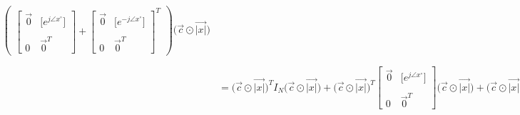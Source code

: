 \documentclass{article}
\begin{document}
\begin{align*}
\begin{pmatrix}
                                                                         \begin{bmatrix}
                                                                            \vec{0} & \big[e^{j\angle{x}^{\circ}}\big] \\ \\
                                                                            0 & \vec{0}^{T}
                                                                           \end{bmatrix} +
                                                                         \begin{bmatrix}
                                                                            \vec{0} & \big[e^{-j\angle{x}^{\circ}}\big] \\ \\
                                                                            0 & \vec{0}^{T}
                                                                          \end{bmatrix}^{T}\end{pmatrix}\Big(\vec{c} \odot \vec{|x|}\Big) \\ \\
                           &= \Big(\vec{c} \odot \vec{|x|}\Big)^{T}I_{N}\Big(\vec{c} \odot \vec{|x|}\Big) +
                              \Big(\vec{c} \odot \vec{|x|}\Big)^{T}\begin{bmatrix}
                                                                        \vec{0} & \big[e^{j\angle{x}^{\circ}}\big] \\ \\
                                                                        0 & \vec{0}^{T}
                                                                     \end{bmatrix}\Big(\vec{c} \odot \vec{|x|}\Big) +
                              \Big(\vec{c} \odot \vec{|x|}\Big)^{T}\begin{bmatrix}
                                                                        \vec{0} & \big[e^{-j\angle{x}^{\circ}}\big] \\ \\
                                                                        0 & \vec{0}^{T}
                                                                     \end{bmatrix}^{T}\Big(\vec{c} \odot \vec{|x|}\Big) \\ \\

\end{align*}
\end{document}
